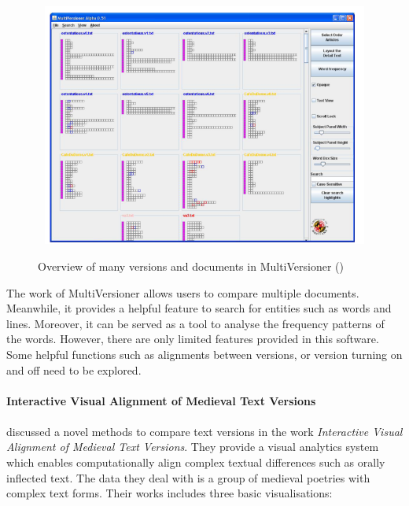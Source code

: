 \begin{figure}[H]
	\centering	
	\includegraphics[width=13cm, height=8cm]{Figs/MultiVersioner}\\[1ex]
	\caption{Overview of many versions and documents in MultiVersioner (\cite{Jong2008})}
	\label{fig:multiVersioner}
\end{figure} 

The work of MultiVersioner allows users to compare multiple documents. Meanwhile, it provides a helpful feature to search for entities such as words and lines. Moreover, it can be served as a tool to analyse the frequency patterns of the words. However, there are only limited features provided in this software. Some helpful functions such as alignments between versions, or version turning on and off need to be explored.

\paragraph{Interactive Visual Alignment of Medieval Text Versions}
\paragraph[]{}

\cite{Stefan2017} discussed a novel methods to compare text versions in the work \emph{Interactive Visual Alignment of Medieval Text Versions}. They provide a visual analytics system which enables computationally align complex textual differences such as orally inflected text. The data they deal with is a group of medieval poetries with complex text forms. Their works includes three basic visualisations:

